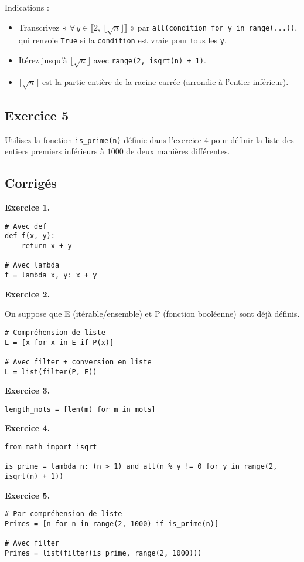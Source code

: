 \documentclass[11pt,a4paper]{article}
\newcommand{\excorr}[1]{%
  \vspace{.6\baselineskip}%
  \noindent\textbf{Exercice #1.}\par
  \vspace{.4\baselineskip}%
}
\begin{document}
Indications :
\begin{itemize}
  \item Transcrivez « $\forall\, y \in \llbracket 2,\ \lfloor \sqrt{n} \rfloor \rrbracket$ » par \texttt{all(condition for y in range(...))}, qui renvoie \texttt{True} si la \texttt{condition} est vraie pour tous les \texttt{y}.
  \item Itérez jusqu'à $\lfloor \sqrt{n} \rfloor$ avec \texttt{range(2, isqrt(n) + 1)}.
  \item $\lfloor \sqrt{n} \rfloor$ est la partie entière de la racine carrée (arrondie à l'entier inférieur).
\end{itemize}

\subsection*{Exercice 5}
Utilisez la fonction \texttt{is\_prime(n)} définie dans l'exercice 4 pour définir la liste des entiers premiers inférieurs à $1000$ de deux manières différentes.

\bigskip
\begin{center}
\subsection*{Corrigés}
\end{center}

\excorr{1}
\begin{lstlisting}
# Avec def
def f(x, y):
    return x + y

# Avec lambda
f = lambda x, y: x + y
\end{lstlisting}

\excorr{2}
On suppose que E (itérable/ensemble) et P (fonction booléenne) sont déjà définis.
\begin{lstlisting}
# Compréhension de liste
L = [x for x in E if P(x)]

# Avec filter + conversion en liste
L = list(filter(P, E))
\end{lstlisting}

\excorr{3}
\begin{lstlisting}
length_mots = [len(m) for m in mots]
\end{lstlisting}

\excorr{4}
\begin{lstlisting}
from math import isqrt

is_prime = lambda n: (n > 1) and all(n % y != 0 for y in range(2, isqrt(n) + 1))
\end{lstlisting}

\excorr{5}
\begin{lstlisting}
# Par compréhension de liste
Primes = [n for n in range(2, 1000) if is_prime(n)]

# Avec filter
Primes = list(filter(is_prime, range(2, 1000)))
\end{lstlisting}
\end{document}
